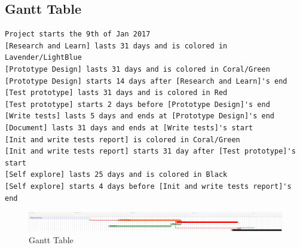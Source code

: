 \documentclass[12pt]{scrartcl}
\begin{document}
\subsection{Gantt Table}
\label{sec:orge216bd9}
\begin{verbatim}
Project starts the 9th of Jan 2017
[Research and Learn] lasts 31 days and is colored in Lavender/LightBlue
[Prototype Design] lasts 31 days and is colored in Coral/Green
[Prototype Design] starts 14 days after [Research and Learn]'s end
[Test prototype] lasts 31 days and is colored in Red
[Test prototype] starts 2 days before [Prototype Design]'s end
[Write tests] lasts 5 days and ends at [Prototype Design]'s end
[Document] lasts 31 days and ends at [Write tests]'s start
[Init and write tests report] is colored in Coral/Green
[Init and write tests report] starts 31 day after [Test prototype]'s start
[Self explore] lasts 25 days and is colored in Black
[Self explore] starts 4 days before [Init and write tests report]'s end
\end{verbatim}

\begin{figure}[htbp]
\caption{\label{fig:orgf349192}
Gantt Table}
\centering
\includegraphics[width=.9\linewidth]{img/gantt.png}
\end{figure}
\end{document}
